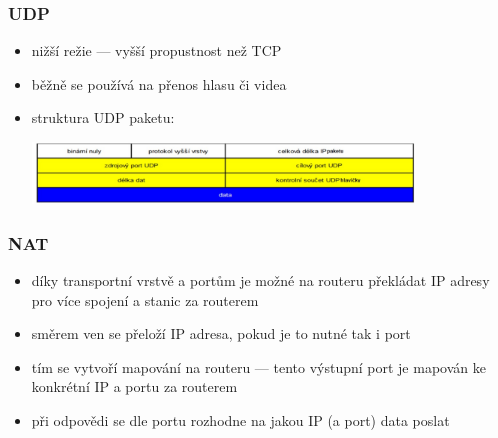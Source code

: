 \subsubsection*{UDP}
\begin{itemize}
	\item nižší režie --- vyšší propustnost než TCP
	\item běžně se používá na přenos hlasu či videa
	\item struktura UDP paketu:
	
	\includegraphics[width=0.8\textwidth]{img/SP-25_3.jpg}
\end{itemize}

\subsubsection*{NAT}
\begin{itemize}
	\item díky transportní vrstvě a portům je možné na routeru překládat IP adresy pro více spojení a stanic za routerem
	\item směrem ven se přeloží IP adresa, pokud je to nutné tak i port
	\item tím se vytvoří mapování na routeru --- tento výstupní port je mapován ke konkrétní IP a portu za routerem
	\item při odpovědi se dle portu rozhodne na jakou IP (a port) data poslat
\end{itemize}

